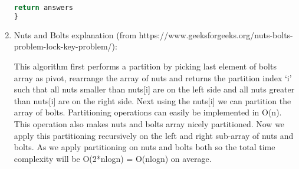\documentclass{article}
\begin{document}
\begin{enumerate}
\begin{lstlisting}[language=python]
    return answers
}
	      \end{lstlisting}

	\item Nuts and Bolts explanation (from https://www.geeksforgeeks.org/nuts-bolts-problem-lock-key-problem/):

	      This algorithm first performs a partition by picking last element of bolts array as pivot, rearrange the array of nuts and returns the partition index ‘i’ such that all nuts smaller than nuts[i] are on the left side and all nuts greater than nuts[i] are on the right side. Next using the nuts[i] we can partition the array of bolts. Partitioning operations can easily be implemented in O(n). This operation also makes nuts and bolts array nicely partitioned. Now we apply this partitioning recursively on the left and right sub-array of nuts and bolts. As we apply partitioning on nuts and bolts both so the total time complexity will be O(2*nlogn) = O(nlogn) on average.

\end{enumerate}
\end{document}
